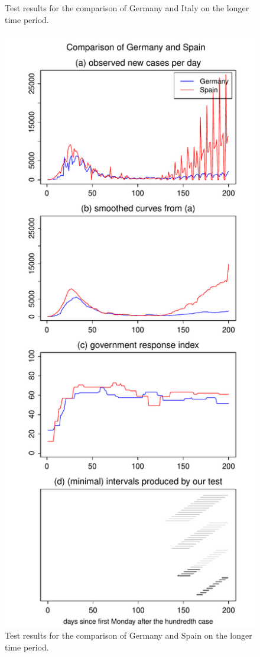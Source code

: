 \documentclass[a4paper,12pt]{article}
\numberwithin{equation}{section}
\begin{document}
{\begin{figure}[h!]
\begin{minipage}[t]{0.49\textwidth}
\caption{Test results for the comparison of Germany and Italy on the longer time period.}\label{fig:supp3:first}
\end{minipage}
\hspace{0.25cm}
\begin{minipage}[t]{0.49\textwidth}
\includegraphics[width=\textwidth]{plots/DEU_vs_ESP_long}
\caption{Test results for the comparison of Germany and Spain on the longer time period.}
\end{minipage}
\end{figure}


}
\end{document}
